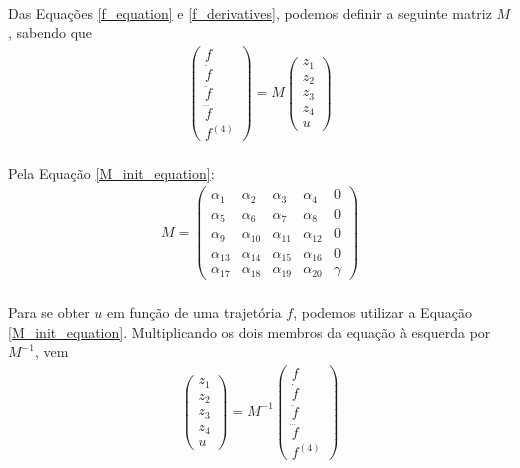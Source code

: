 \documentclass[a4paper,11pt]{scrartcl} %
\numberwithin{equation}{section} %
\numberwithin{figure}{section} %
\numberwithin{table}{section} %
\begin{document}
\paragraph{}Das Equações \ref{f_equation} e \ref{f_derivatives}, podemos definir a seguinte matriz $M$, sabendo que
\begin{align}
\label{M_init_equation}
\left (
\begin{array}{c}
f \\ \dot{f} \\ \ddot{f} \\ \dddot{f} \\ f^{(4)}
\end{array}
\right ) = M \left(
\begin{array}{c}
z_1 \\ z_2 \\ z_3 \\ z_4 \\ u
\end{array}
\right)
\end{align}
\paragraph{}Pela Equação \ref{M_init_equation}:
\begin{align}
\label{M_decl_ref}
M = \left (
\begin{array}{ccccc}
	\alpha_{1} & \alpha_{2} & \alpha_{3} & \alpha_{4} & 0 \\
	\alpha_{5} & \alpha_{6} & \alpha_{7} & \alpha_{8} & 0 \\
	\alpha_{9} & \alpha_{10} & \alpha_{11} & \alpha_{12} & 0 \\
	\alpha_{13} & \alpha_{14} & \alpha_{15} & \alpha_{16} & 0 \\
	\alpha_{17} & \alpha_{18} & \alpha_{19} & \alpha_{20} & \gamma
\end{array}
\right )
\end{align}
\paragraph{}Para se obter $u$ em função de uma trajetória $f$, podemos utilizar a Equação \ref{M_init_equation}. Multiplicando os dois membros da equação à esquerda por $M^{-1}$, vem
\begin{align}
\label{M_inv_equation}
\left(
\begin{array}{c}
z_1 \\ z_2 \\ z_3 \\ z_4 \\ u
\end{array}
\right) = M^{-1}\left (
\begin{array}{c}
f \\ \dot{f} \\ \ddot{f} \\ \dddot{f} \\ f^{(4)}
\end{array}
\right )
\end{align}
\end{document}
